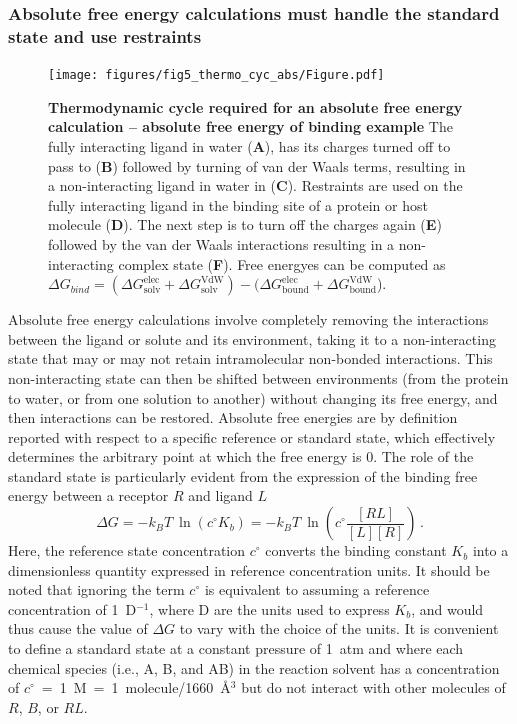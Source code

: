 \documentclass[9pt,bestpractices]{livecoms}
\begin{document}
\subsubsection{Absolute free energy calculations must handle the standard state and use restraints}
\label{sec:standardstate-restraints}
%
\begin{figure}
    \texttt{[image: figures/fig5\_thermo\_cyc\_abs/Figure.pdf]}
    \caption{\textbf{Thermodynamic cycle required for an absolute free energy calculation -- absolute free energy of binding example} The fully interacting ligand in water (\textbf{A}), has its charges turned off to pass to (\textbf{B}) followed by turning of van der Waals terms, resulting in a non-interacting ligand in water in (\textbf{C}). Restraints are used on the fully interacting ligand in the binding site of a protein or host molecule (\textbf{D}). The next step is to turn off the charges again (\textbf{E}) followed by the van der Waals interactions resulting in a non-interacting complex state (\textbf{F}). Free energyes can be computed as $\Delta G_{bind} = (\Delta G^{\mathrm{elec}}_{\mathrm{solv}}+ \Delta G^{\mathrm{VdW}}_{\mathrm{solv}})-(\Delta G^{\mathrm{elec}}_{\mathrm{bound}}+ \Delta G^{\mathrm{VdW}}_{\mathrm{bound}}$).
    }
    \label{fig:fig_absolute_thermodynamic_cycle}
\end{figure}
%
Absolute free energy calculations involve completely removing the interactions between the ligand or solute and its environment, taking it to a non-interacting state that may or may not retain intramolecular non-bonded interactions.
This non-interacting state can then be shifted between environments (from the protein to water, or from one solution to another) without changing its free energy, and then interactions can be restored.
%
Absolute free energies are by definition  reported with respect to a specific reference or standard state, which effectively determines the arbitrary point at which the free energy is 0.
The role of the standard state is particularly evident from the expression of the binding free energy between a receptor $R$ and ligand $L$
\begin{equation} \label{eq:DGfromKAB}
    \Delta G = -k_BT ~ \ln \left( c^{\circ} K_b \right)  = -k_BT ~ \ln\left( c^{\circ} \frac{[RL]}{[L][R]} \right) \, .
\end{equation}
Here, the reference state concentration $c^{\circ}$ converts the binding constant $K_b$ into a dimensionless quantity expressed in reference concentration units.
It should be noted that ignoring the term $c^{\circ}$ is equivalent to assuming a reference concentration of 1~D$^{-1}$, where D are the units used to express $K_b$, and would thus cause the value of $\Delta G$ to vary with the choice of the units.
It is convenient to define a standard state at a constant pressure of 1~atm and where each chemical species (i.e., A, B, and AB) in the reaction solvent has a concentration of $c^{\circ}$~=~1~M~=~1~molecule/1660~\r{A}$^3$ but do not interact with other molecules of $R$, $B$, or $RL$.
%
\end{document}
